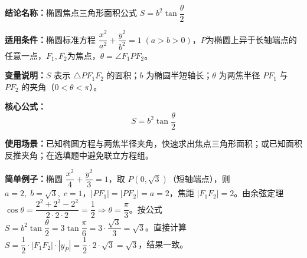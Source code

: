 \textbf{结论名称：}椭圆焦点三角形面积公式 $S = b^{2}\tan\dfrac{\theta}{2}$

\textbf{适用条件：}椭圆标准方程 $\dfrac{x^{2}}{a^{2}}+\dfrac{y^{2}}{b^{2}}=1\;(a>b>0)$，$P$为椭圆上异于长轴端点的任意一点，$F_{1},F_{2}$为焦点，$\theta = \angle F_{1}PF_{2}$。

\textbf{变量说明：}$S$ 表示 $\triangle PF_{1}F_{2}$ 的面积；$b$ 为椭圆半短轴长；$\theta$ 为两焦半径 $PF_{1}$ 与 $PF_{2}$ 的夹角（$0<\theta<\pi$）。

\textbf{核心公式：}
\[
\boxed{S = b^{2}\tan\frac{\theta}{2}}
\]

\textbf{使用场景：}已知椭圆方程与两焦半径夹角，快速求出焦点三角形面积；或已知面积反推夹角；在选填题中避免联立方程组。

\textbf{简单例子：}椭圆 $\dfrac{x^{2}}{4}+\dfrac{y^{2}}{3}=1$，取 $P(0,\sqrt{3})$（短轴端点），则 $a=2,\;b=\sqrt{3},\;c=1$，$|PF_{1}|=|PF_{2}|=a=2$，焦距 $|F_{1}F_{2}|=2$。由余弦定理 $\cos\theta=\dfrac{2^{2}+2^{2}-2^{2}}{2\cdot2\cdot2}=\dfrac{1}{2}\Rightarrow\theta=\dfrac{\pi}{3}$。按公式 $S=b^{2}\tan\dfrac{\theta}{2}=3\tan\dfrac{\pi}{6}=3\cdot\dfrac{\sqrt{3}}{3}=\sqrt{3}$。直接计算 $S=\dfrac{1}{2}\cdot|F_{1}F_{2}|\cdot|y_{P}|=\dfrac{1}{2}\cdot2\cdot\sqrt{3}=\sqrt{3}$，结果一致。